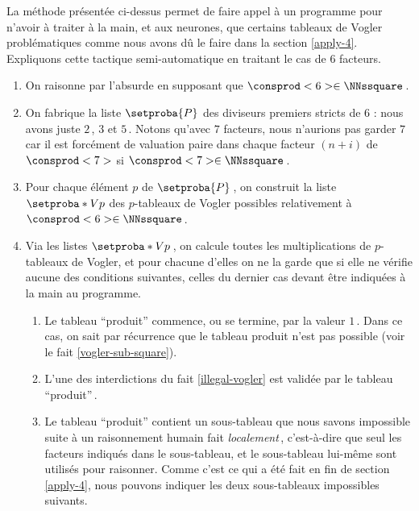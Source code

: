 La méthode présentée ci-dessus permet de faire appel à un programme pour n'avoir à traiter à la main, et aux neurones, que certains tableaux de Vogler problématiques comme nous avons dû le faire dans la section \ref{apply-4}.
Expliquons cette tactique semi-automatique en traitant le cas de $6$ facteurs.


\begin{enumerate}
	\item On raisonne par l'absurde en supposant que $\consprod<6> \in \NNssquare$\,.
	
 
	\item On fabrique la liste $\setproba{P}$ des diviseurs premiers stricts de $6$ : nous avons juste $2$\,, $3$ et $5$\,.
	Notons qu'avec $7$ facteurs, nous n'aurions pas garder $7$ car il est forcément de valuation paire dans chaque facteur $(n + i)$ de $\consprod<7>$ si $\consprod<7> \in \NNssquare$\,.
	
 
	\item Pour chaque élément $p$ de $\setproba{P}$\,, on construit la liste $\setproba*{V}{p}$ des $p$-tableaux de Vogler possibles relativement à $\consprod<6> \in \NNssquare$\,.
	
 
	\item Via les listes $\setproba*{V}{p}$\,, on calcule toutes les multiplications de $p$-tableaux de Vogler, et pour chacune d'elles on ne la garde que si elle ne vérifie aucune des conditions suivantes, celles du dernier cas devant être indiquées à la main au programme.
	\begin{enumerate}
		\item Le tableau \enquote{produit} commence, ou se termine, par la valeur $1$\,. Dans ce cas, on sait par récurrence que le tableau produit n'est pas possible (voir le fait \ref{vogler-sub-square}). 

		\item L'une des interdictions du fait \ref{illegal-vogler} est validée par le tableau \enquote{produit}\,.
		
		\item Le tableau \enquote{produit} contient un sous-tableau que nous savons impossible suite à un raisonnement humain fait \emph{localement}\,, c'est-à-dire que seul les facteurs indiqués dans le sous-tableau, et le sous-tableau lui-même sont utilisés pour raisonner.
		Comme c'est ce qui a été fait en fin de section \ref{apply-4}, nous pouvons indiquer les deux sous-tableaux impossibles suivants.
	\end{enumerate}
\end{enumerate}

